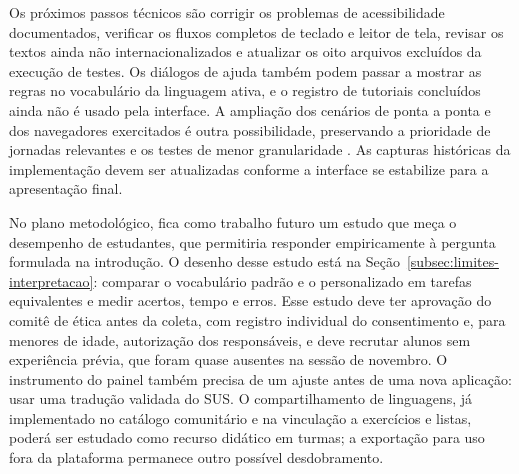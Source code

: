 Os próximos passos técnicos são corrigir os problemas de acessibilidade documentados, verificar os fluxos completos de teclado e leitor de tela, revisar os textos ainda não internacionalizados e atualizar os oito arquivos excluídos da execução de testes. Os diálogos de ajuda também podem passar a mostrar as regras no vocabulário da linguagem ativa, e o registro de tutoriais concluídos ainda não é usado pela interface. A ampliação dos cenários de ponta a ponta e dos navegadores exercitados é outra possibilidade, preservando a prioridade de jornadas relevantes e os testes de menor granularidade \cite{vocke2018pyramid}. As capturas históricas da implementação devem ser atualizadas conforme a interface se estabilize para a apresentação final.

No plano metodológico, fica como trabalho futuro um estudo que meça o desempenho de estudantes, que permitiria responder empiricamente à pergunta formulada na introdução. O desenho desse estudo está na Seção~\ref{subsec:limites-interpretacao}: comparar o vocabulário padrão e o personalizado em tarefas equivalentes e medir acertos, tempo e erros. Esse estudo deve ter aprovação do comitê de ética antes da coleta, com registro individual do consentimento e, para menores de idade, autorização dos responsáveis, e deve recrutar alunos sem experiência prévia, que foram quase ausentes na sessão de novembro. O instrumento do painel também precisa de um ajuste antes de uma nova aplicação: usar uma tradução validada do SUS. O compartilhamento de linguagens, já implementado no catálogo comunitário e na vinculação a exercícios e listas, poderá ser estudado como recurso didático em turmas; a exportação para uso fora da plataforma permanece outro possível desdobramento.
